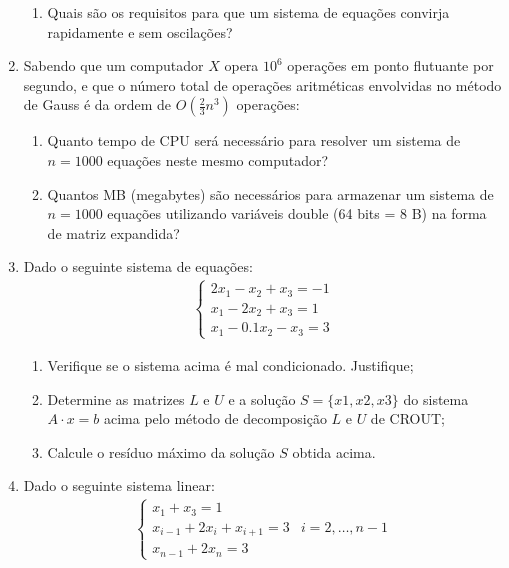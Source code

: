 \documentclass[12pt]{article}
\newenvironment{smallitem}{
    \vspace{-2mm}
    \begin{enumerate}
    \setlength{\parskip}{0pt}
    \setlength{\itemsep}{2pt}
}{
    \vspace{-2mm}
    \end{enumerate}
}
\begin{document}
\begin{enumerate}[label=\textbf{\arabic*})]
\begin{smallitem}
\item Quais são os requisitos para que um sistema de equações convirja
rapidamente e sem oscilações?

\end{smallitem}

\item Sabendo que um computador $X$ opera $10^6$  operações em ponto flutuante
por segundo, e que o número total de operações aritméticas envolvidas no
método de Gauss é da ordem de $O(\frac{2}{3} n^3)$ operações:

\begin{smallitem}

\item Quanto tempo de CPU será necessário para resolver um sistema de $n =
1000$ equações neste mesmo computador?

\item Quantos MB (megabytes) são necessários para armazenar um sistema de $n =
1000$ equações utilizando variáveis double (64 bits = 8 B) na forma de matriz
expandida?

\end{smallitem}

\item Dado o seguinte sistema de equações:
\begin{align*}
\begin{cases}
2x_1 - x_2 + x_3 = -1 \\
x_1 - 2x_2 + x_3 = 1 \\
x_1 - 0.1x_2 - x_3 = 3
\end{cases}
\end{align*}

\begin{smallitem}

\item Verifique se o sistema acima é mal condicionado. Justifique;

\item Determine as matrizes $L$ e $U$ e a solução $S = \{x1, x2, x3\}$ do
sistema $A \cdot x = b$ acima pelo método de decomposição $L$ e $U$ de CROUT;

\item Calcule o resíduo máximo da solução $S$ obtida acima.

\end{smallitem}

\item Dado o seguinte sistema linear:
\begin{align*}
\begin{cases}
x_1 + x_3 = 1 \\
x_{i - 1} + 2x_i + x_{i + 1} = 3 & i = 2, \dots, n - 1 \\
x_{n - 1} + 2x_n = 3
\end{cases}
\end{align*}


\end{enumerate}
\end{document}
